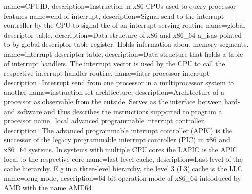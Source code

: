 
%
{
    name=CPUID,
    description={Instruction in x86 CPUs used to query processor features}
}
%
{
    name=end of interrupt,
    description={Signal send to the interrupt controller by the CPU to signal the of an interrupt serving routine}
}
%
{
    name=global descriptor table,
    description={Data structure of x86 and x86\_64 \acrshort{a_isa}s pointed to by global descriptor table register.
            Holds information about memory segments.}
}
%
{
    name=interrupt descriptor table,
    description={Data structure that holds a table of interrupt handlers. The interrupt vector is used by the CPU to
            call the respective interrupt handler routine.}
}
{
    name=inter-processor interrupt,
    description={Interrupt send from one processor in a multiprocessor system to another}
}
{
    name=instruction set architecture,
    description={Architecture of a processor as observable from the outside. Serves as the interface between hard- and
            software and thus describes the instructions supported to program a processor}
}
%
{
    name=local advanced programmable interrupt controller,
    description={The advanced programmable interrupt controller (APIC) is the successor of the legacy programmable
            interrupt controller (PIC) in x86 and x86\_64 systems. In systems with multiple CPU cores the LAPIC is the
            APIC local to the respective core}
}
{
    name=last level cache,
    description={Last level of the cache hierarchy. E.g in a three-level hierarchy, the level 3 (L3) cache is the LLC}
}
{
    name=long mode,
    description={64 bit operation mode of x86\_64 introduced by AMD with the name AMD64}
}
%
